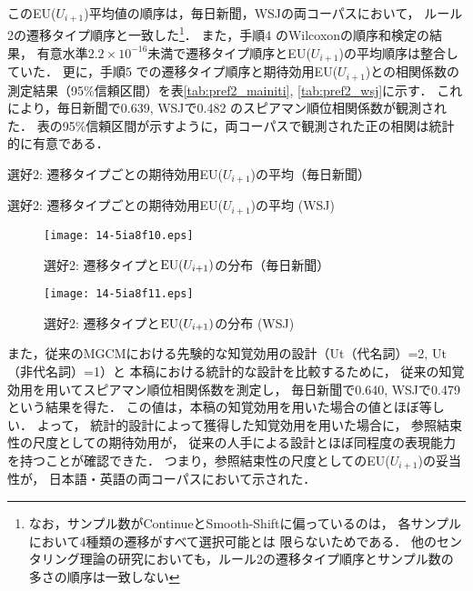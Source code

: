 \documentclass[japanese]{jnlp_1.3e}
\begin{document}
このEU($U_{i+1}$)平均値の順序は，毎日新聞，WSJの両コーパスにおいて，
ルール2の遷移タイプ順序と一致した\footnote{
	なお，サンプル数がContinueとSmooth-Shiftに偏っているのは，
各サンプルにおいて4種類の遷移がすべて選択可能とは
限らないためである．
他のセンタリング理論の研究においても，ルール2の遷移タイプ順序とサンプル数の多さの順序は一致しない}．
また，手順4 のWilcoxonの順序和検定の結果，
有意水準$2.2\times 10^{-16}$未満で遷移タイプ順序とEU($U_{i+1}$)の平均順序は整合していた．
更に，手順5 での遷移タイプ順序と期待効用EU($U_{i+1}$)との相関係数の測定結果（95\%信頼区間）を表\ref{tab:pref2_mainiti}, \ref{tab:pref2_wsj}に示す．
これにより，毎日新聞で0.639, WSJで0.482 のスピアマン順位相関係数が観測された．
表の95\%信頼区間が示すように，両コーパスで観測された正の相関は統計的に有意である．

\begin{table}[t]
\caption{選好2: 遷移タイプごとの期待効用EU($U_{i+1}$)の平均（毎日新聞）}
\label{tab:tran_jpn}

\end{table}
\begin{table}[t]
\caption{選好2: 遷移タイプごとの期待効用EU($U_{i+1}$)の平均 (WSJ)}
\label{tab:tran_eng}

\end{table}
\begin{figure}[t]
\begin{center}
      \texttt{[image: 14-5ia8f10.eps]}
  \caption{選好2: 遷移タイプと${\rm EU}(U_{i+1})$の分布（毎日新聞）}
  \label{fig:tran_eu_mainiti}
 \end{center}
\end{figure}
\begin{figure}[t]
\begin{center}
      \texttt{[image: 14-5ia8f11.eps]}
  \caption{選好2: 遷移タイプと${\rm EU}(U_{i+1})$の分布 (WSJ)}
  \label{fig:tran_eu_wsj}
 \end{center}
\end{figure}


また，従来のMGCMにおける先験的な知覚効用の設計（Ut（代名詞）=2, Ut（非代名詞）=1）と
本稿における統計的な設計を比較するために，
従来の知覚効用を用いてスピアマン順位相関係数を測定し，
毎日新聞で0.640, WSJで0.479という結果を得た．
この値は，本稿の知覚効用を用いた場合の値とほぼ等しい．
よって，
統計的設計によって獲得した知覚効用を用いた場合に，
参照結束性の尺度としての期待効用が，
従来の人手による設計とほぼ同程度の表現能力を持つことが確認できた．
つまり，参照結束性の尺度としてのEU($U_{i+1}$)の妥当性が，
日本語・英語の両コーパスにおいて示された．
\end{document}
